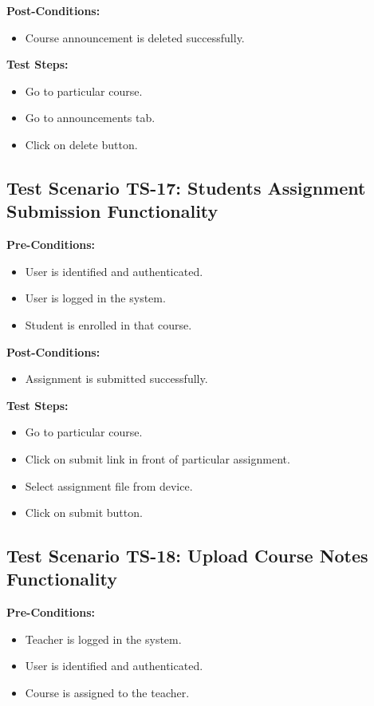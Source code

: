\textbf{Post-Conditions: }
\begin{itemize}

\item Course announcement is deleted successfully.

\end{itemize}
\textbf{Test Steps:}
\begin{itemize}

\item Go to particular course.
\item Go to announcements tab.
\item Click on delete button.

\end{itemize}



\subsection{Test Scenario TS-17: Students Assignment Submission Functionality}
\textbf{Pre-Conditions: }
\begin{itemize}

\item User is identified and authenticated.
\item User is logged in the system.
\item Student is enrolled in that course.

\end{itemize}

\textbf{Post-Conditions: }
\begin{itemize}

\item Assignment is submitted successfully.

\end{itemize}
\textbf{Test Steps:}
\begin{itemize}

\item Go to particular course.
\item Click on submit link in front of particular assignment.
\item Select assignment file from device.
\item Click on submit button.

\end{itemize}


\subsection{Test Scenario TS-18: Upload Course Notes Functionality}
\textbf{Pre-Conditions: }
\begin{itemize}

\item Teacher is logged in the system.
\item User is identified and authenticated.
\item Course is assigned to the teacher.

\end{itemize}

